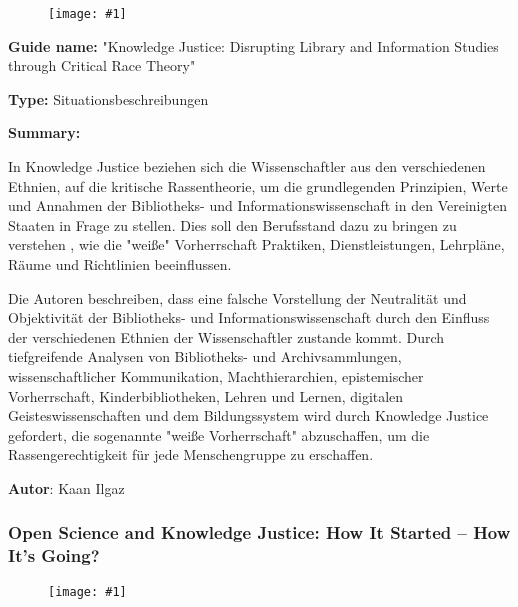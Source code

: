 \documentclass{article}
\newlength{\imgwidth}
\newcommand\scaledgraphics[2]{%
                
\settowidth{\imgwidth}{\texttt{[image: \#1]}}%
                
\setlength{\imgwidth}{\minof{\imgwidth}{#2\textwidth}}%
                
\texttt{[image: \#1]}%
                
}
\begin{document}
\begin{center}
\begin{figure}
\scaledgraphics{dcc1d35b-4186-4b50-a5a6-cf54422a8064.jpeg}{0.5}
\label{F29320001}
\end{figure}


\end{center}





\textbf{Guide name:} "Knowledge Justice: Disrupting Library and Information Studies through Critical Race Theory" \autocite{leung_knowledge_2021}


\textbf{Type:} Situationsbeschreibungen


\textbf{Summary:}

In Knowledge Justice beziehen sich die Wissenschaftler aus den verschiedenen Ethnien, auf die kritische Rassentheorie, um die grundlegenden Prinzipien, Werte und Annahmen der Bibliotheks- und Informationswissenschaft in den Vereinigten Staaten in Frage zu stellen. Dies soll den Berufsstand dazu zu bringen zu verstehen , wie die "weiße" Vorherrschaft Praktiken, Dienstleistungen, Lehrpläne, Räume und Richtlinien beeinflussen.


Die Autoren beschreiben, dass eine falsche Vorstellung der Neutralität und Objektivität der Bibliotheks- und Informationswissenschaft durch den Einfluss der verschiedenen Ethnien der Wissenschaftler zustande kommt. Durch tiefgreifende Analysen von Bibliotheks- und Archivsammlungen, wissenschaftlicher Kommunikation, Machthierarchien, epistemischer Vorherrschaft, Kinderbibliotheken, Lehren und Lernen, digitalen Geisteswissenschaften und dem Bildungssystem wird durch Knowledge Justice gefordert, die sogenannte "weiße Vorherrschaft" abzuschaffen, um die Rassengerechtigkeit für jede Menschengruppe zu erschaffen. 


\textbf{Autor}: Kaan Ilgaz


\subsubsection{Open Science and Knowledge Justice: How It Started – How It’s Going?}\label{H480694}


\begin{figure}
\scaledgraphics{e590694e-3a8f-4a2f-801f-704d7d8edbc0.png}{1}
\label{F3873651}
\end{figure}
\end{document}
